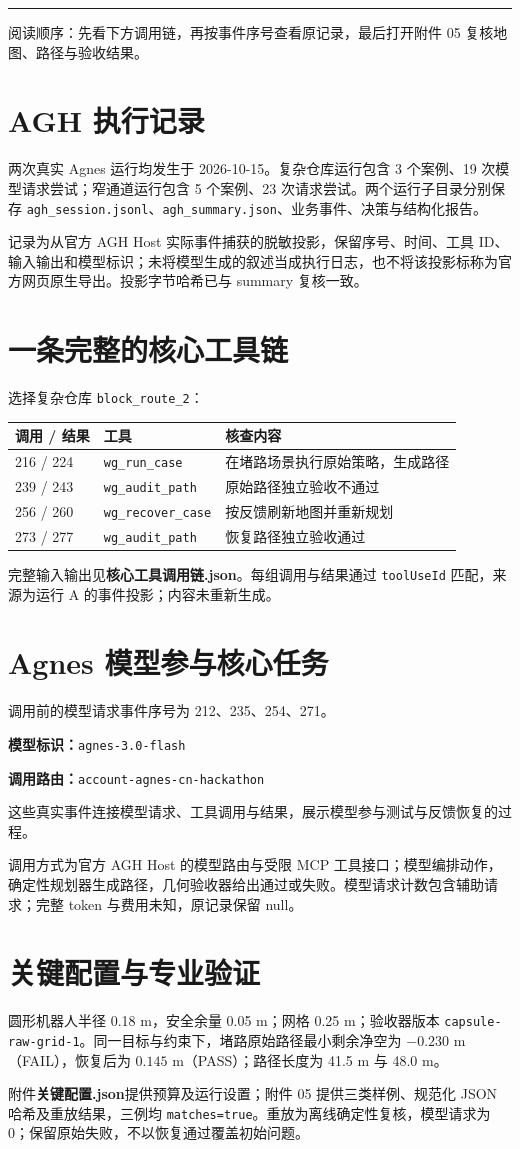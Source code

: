 \documentclass[UTF8,10pt,a4paper]{ctexart}
\newcommand{\cover}[2]{\vspace*{5mm}{\small\textcolor{teal}{WORLDGUARD / SUBMISSION 2026}}\par\vspace{4mm}{\huge\bfseries\color{ink}#1}\par\vspace{3mm}{\large #2}\par\vspace{4mm}\hrule\vspace{5mm}}
\newcommand{\note}[1]{\par\smallskip\noindent\colorbox{teal!7}{\parbox{0.95\linewidth}{\small #1}}\par\smallskip}
\begin{document}
\cover{运行证据核查指南}{真实记录 · 模型参与 · 工具调用 · 独立验证}
\note{阅读顺序：先看下方调用链，再按事件序号查看原记录，最后打开附件 05 复核地图、路径与验收结果。}
\section{AGH 执行记录}
两次真实 Agnes 运行均发生于 2026-10-15。复杂仓库运行包含 3 个案例、19 次模型请求尝试；窄通道运行包含 5 个案例、23 次请求尝试。两个运行子目录分别保存 \texttt{agh\_session.jsonl}、\texttt{agh\_summary.json}、业务事件、决策与结构化报告。

记录为从官方 AGH Host 实际事件捕获的脱敏投影，保留序号、时间、工具 ID、输入输出和模型标识；未将模型生成的叙述当成执行日志，也不将该投影标称为官方网页原生导出。投影字节哈希已与 summary 复核一致。
\section{一条完整的核心工具链}
选择复杂仓库 \texttt{block\_route\_2}：
\begin{center}\begin{tabularx}{\linewidth}{p{18mm}p{37mm}X}\toprule
调用 / 结果 & 工具 & 核查内容\\\midrule
216 / 224 & \texttt{wg\_run\_case} & 在堵路场景执行原始策略，生成路径\\
239 / 243 & \texttt{wg\_audit\_path} & 原始路径独立验收不通过\\
256 / 260 & \texttt{wg\_recover\_case} & 按反馈刷新地图并重新规划\\
273 / 277 & \texttt{wg\_audit\_path} & 恢复路径独立验收通过\\\bottomrule
\end{tabularx}\end{center}
完整输入输出见\textbf{核心工具调用链.json}。每组调用与结果通过 \texttt{toolUseId} 匹配，来源为运行 A 的事件投影；内容未重新生成。
\section{Agnes 模型参与核心任务}
调用前的模型请求事件序号为 212、235、254、271。\par
\textbf{模型标识：}\texttt{agnes-3.0-flash}\par
\textbf{调用路由：}\texttt{account-agnes-cn-hackathon}\par
这些真实事件连接模型请求、工具调用与结果，展示模型参与测试与反馈恢复的过程。

调用方式为官方 AGH Host 的模型路由与受限 MCP 工具接口；模型编排动作，确定性规划器生成路径，几何验收器给出通过或失败。模型请求计数包含辅助请求；完整 token 与费用未知，原记录保留 null。
\section{关键配置与专业验证}
圆形机器人半径 0.18 m，安全余量 0.05 m；网格 0.25 m；验收器版本 \texttt{capsule-raw-grid-1}。同一目标与约束下，堵路原始路径最小剩余净空为 $-0.230$ m（FAIL），恢复后为 $0.145$ m（PASS）；路径长度为 41.5 m 与 48.0 m。

附件\textbf{关键配置.json}提供预算及运行设置；附件 05 提供三类样例、规范化 JSON 哈希及重放结果，三例均 \texttt{matches=true}。重放为离线确定性复核，模型请求为 0；保留原始失败，不以恢复通过覆盖初始问题。
\end{document}
